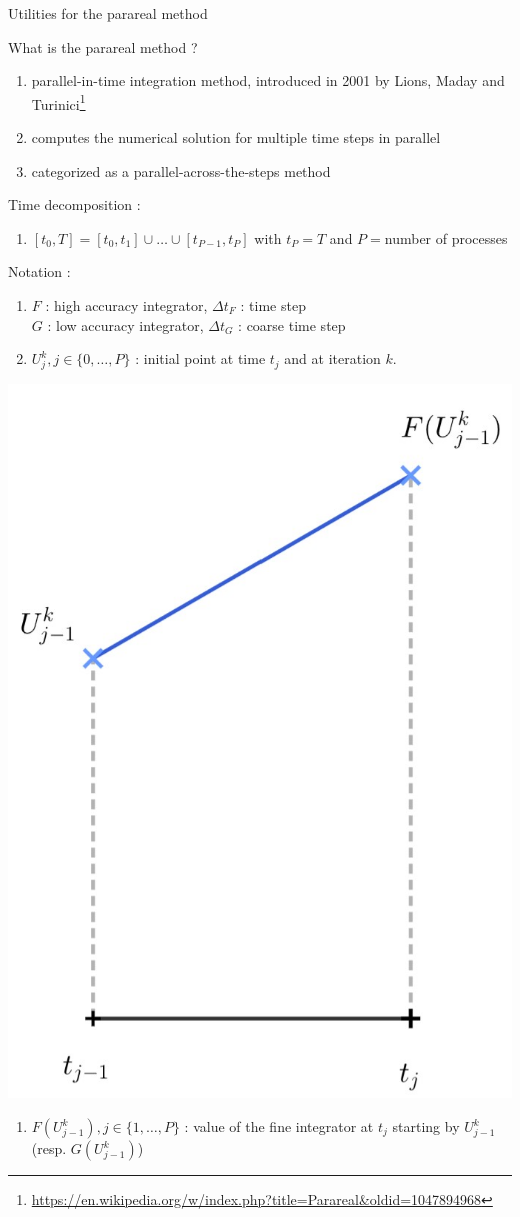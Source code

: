 \begin{frame}[allowframebreaks]{Utilities for the parareal method}
	
	\small
	What is the parareal method ?
	\begin{enumerate}[\textbullet]
		\item parallel-in-time integration method, introduced in 2001 by Lions, Maday and Turinici\footnote[frame]{\url{https://en.wikipedia.org/w/index.php?title=Parareal&oldid=1047894968}}
		\item computes the numerical solution for multiple time steps in parallel
		\item categorized as a parallel-across-the-steps method 
	\end{enumerate}

	Time decomposition :
	\begin{enumerate}[\textbullet]
		\item $[t_0,T]=[t_0,t_1]\cup\dots\cup[t_{P-1},t_P]$ with $t_P=T$ and $P=$number of processes
	\end{enumerate}

	\begin{minipage}{.68\linewidth}
		Notation :
		\begin{enumerate}[\textbullet]
			\item $F$ : high accuracy integrator, \quad $\Delta t_F$ : time step \\
			$G$ : low accuracy integrator, \quad $\Delta t_G$ : coarse time step
			\item $U_j^k, j\in\{0,\dots,P\}$ : initial point at time $t_j$ and at iteration $k$.
		\end{enumerate}
	\end{minipage}
	\begin{minipage}{.28\linewidth}
		\includegraphics[width=0.4\linewidth]{images/parareal/explane_F.jpg}
	\end{minipage}
	\begin{enumerate}[\textbullet]
		\item $F(U_{j-1}^k), j\in\{1,\dots,P\}$ : value of the fine integrator at $t_j$ starting by $U_{j-1}^k$ (resp. $G(U_{j-1}^k)$)
	\end{enumerate}
	
\end{frame}